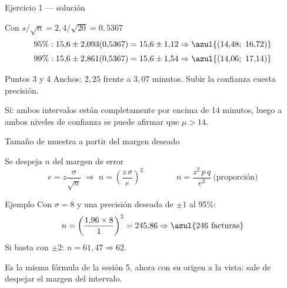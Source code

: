 \documentclass[aspectratio=169,10pt]{beamer}
\begin{document}
\begin{frame}{Ejercicio 1 — solución}
  \small
  \begin{block}{Con $s/\sqrt{n}=2{,}4/\sqrt{20}=0{,}5367$}
    \begin{align*}
      95\%:\;& 15{,}6\pm 2{,}093(0{,}5367)=15{,}6\pm 1{,}12
        \Rightarrow \azul{(14{,}48;\ 16{,}72)}\\[0.25em]
      99\%:\;& 15{,}6\pm 2{,}861(0{,}5367)=15{,}6\pm 1{,}54
        \Rightarrow \azul{(14{,}06;\ 17{,}14)}
    \end{align*}
  \end{block}

  \vspace{0.1cm}
  \begin{exampleblock}{Puntos 3 y 4}
    \footnotesize
    Anchos: $2{,}25$ frente a $3{,}07$ minutos. Subir la confianza cuesta
    precisión.

    \vspace{0.15cm}
    Sí: ambos intervalos están completamente por encima de 14 minutos, luego a
    ambos niveles de confianza se puede afirmar que $\mu>14$.
  \end{exampleblock}
\end{frame}

\begin{frame}{Tamaño de muestra a partir del margen deseado}
  \begin{block}{Se despeja $n$ del margen de error}
    \[ e=z\frac{\sigma}{\sqrt{n}} \;\Longrightarrow\;
       n=\left(\frac{z\,\sigma}{e}\right)^{2}
       \qquad\qquad
       n=\frac{z^{2}\,p\,q}{e^{2}} \ \text{(proporción)} \]
  \end{block}

  \vspace{0.2cm}
  \begin{exampleblock}{Ejemplo}
    \footnotesize
    Con $\sigma=8$ y una precisión deseada de $\pm 1$ al 95\%:
    \[ n=\left(\frac{1{,}96\times 8}{1}\right)^{2}=245{,}86
       \Rightarrow \azul{246 \text{ facturas}} \]
    Si basta con $\pm 2$: $n=61{,}47\Rightarrow 62$. 
  \end{exampleblock}

  \vspace{0.1cm}
  {\scriptsize\color{uniGris} Es la misma fórmula de la sesión 5, ahora con su
  origen a la vista: sale de despejar el margen del intervalo.}
\end{frame}

\end{document}
